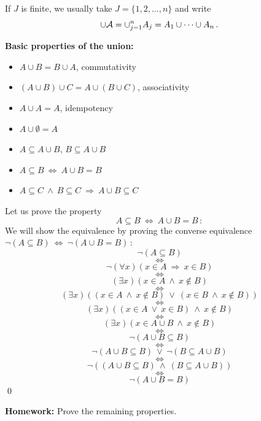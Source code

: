 \documentclass[11pt,paper=b5,footinclude,headinclude]{scrbook} %
\def\ali {{~\vee~}}
\def\inn {{~\wedge~}}
\def\sledi {{~\Rightarrow~}}
\def\cee {{~\Leftrightarrow~}}
\theoremstyle{remark}
\theoremstyle{definition} %
\theoremstyle{theorem} %
\begin{document}
\medskip
If $J$ is finite, we usually take $J = \{1,2,\ldots, n\}$ and write
$$\cup {\cal A} = \cup_{j = 1}^nA_j = A_1\cup\cdots\cup A_n\,.$$

\bigskip
\textbf{ Basic properties of the union:}
\begin{itemize}
  \item $A\cup B = B\cup A$, commutativity
  \item $(A\cup B)\cup C = A\cup (B\cup C)$, associativity
  \item $A\cup A = A$, idempotency
  \item $A\cup \emptyset = A$
  \item $A\subseteq A\cup B$, $B\subseteq A\cup B$
  \item $A\subseteq B\cee A\cup B = B$
  \item $A\subseteq C\inn B\subseteq C\sledi A\cup B \subseteq C$
\end{itemize}

\bigskip
Let us prove the property
$$A\subseteq B\cee A\cup B = B\,:$$
\medskip
We will show the equivalence by proving the converse equivalence
$\neg(A\subseteq B)\cee \neg(A\cup B = B)\,:$
$$\neg(A\subseteq B)$$
$$\cee$$
$$\neg(\forall x)(x\in A\sledi x\in B)$$
$$\cee$$
$$(\exists x)(x\in A \inn x\not\in B)$$
$$\cee$$
$$(\exists x)((x\in A \inn x\not\in B) \ali (x\in B \inn x\not\in B))$$
$$\cee$$
$$(\exists x)((x\in A \ali x\in B)\inn x\not\in B)$$
$$\cee$$
$$(\exists x)(x\in A\cup B\inn x\not\in B)$$
$$\cee$$
$$\neg(A\cup B \subseteq B)$$
$$\cee$$
$$\neg(A\cup B \subseteq B) \ali \neg(B \subseteq A\cup B) $$
$$\cee$$
$$\neg((A\cup B \subseteq B)\inn (B \subseteq A\cup B))$$
$$\cee$$
$$\neg(A\cup B = B)$$
\qed

\bigskip
\textbf{ Homework:} Prove the remaining properties.

\bigskip
\end{document}
